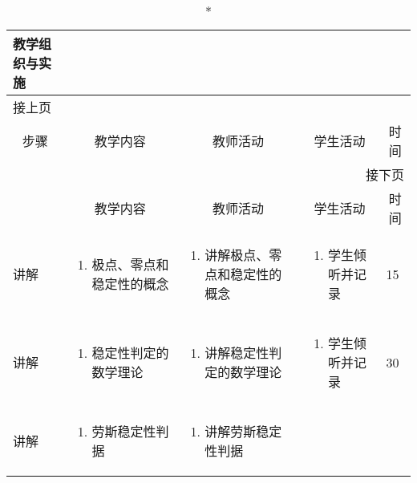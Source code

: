 {%
\begin{landscape}

\begin{longtable}{|m{10mm}|m{50mm}|m{50mm}|m{50mm}|m{15mm}|}
\caption*{\huge 教学组织与实施}\\
\hline
\endfirsthead
\multicolumn{5}{l}{\small 接上页}\\
\hline
\multicolumn{1}{|c|}{步骤}&\multicolumn{1}{c|}{教学内容}&\multicolumn{1}{c|}{教师活动}&\multicolumn{1}{c|}{学生活动}&\multicolumn{1}{c|}{时间}\\
\hline
\endhead

\multicolumn{5}{r}{\small 接下页}\\
\endfoot
\hline
\endlastfoot
\multicolumn{1}{|c|}{步骤}&\multicolumn{1}{c|}{教学内容}&\multicolumn{1}{c|}{教师活动}&\multicolumn{1}{c|}{学生活动}&\multicolumn{1}{c|}{时间}\\\hline
讲解&\begin{enumerate}
\item 极点、零点和稳定性的概念
\end{enumerate} &\begin{enumerate}
\item 讲解极点、零点和稳定性的概念
\end{enumerate} &\begin{enumerate}
\item 学生倾听并记录
\end{enumerate} &15 \\\hline
讲解&\begin{enumerate}
\item 稳定性判定的数学理论
\end{enumerate}
 &\begin{enumerate}
\item 讲解稳定性判定的数学理论
\end{enumerate} &\begin{enumerate}
\item 学生倾听并记录
\end{enumerate} &30 \\\hline
讲解&\begin{enumerate}
\item 劳斯稳定性判据
\end{enumerate}
&\begin{enumerate}
\item 讲解劳斯稳定性判据
\end{enumerate} &\begin{enumerate}

\end{enumerate}
\end{longtable}
\end{landscape}}
